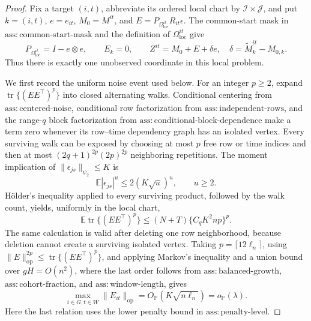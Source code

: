 \documentclass{article}
\begin{document}
\begin{proof}
Fix a target \((i,t)\), abbreviate its ordered local chart by \(\mathcal I\times\mathcal J\), and put \(k=(i,t)\), \(e=e_{it}\), \(M_0=M^{it}\), and \(E=P_{\Omega_{\mathrm{loc}}^{it}}R_{it}\epsilon\). The common-start mask in \(\mathrm{ass:common\mbox{-}start\mbox{-}mask}\) and the definition of \(\Omega_{\mathrm{loc}}^{it}\) give
\[
 P_{\Omega_{\mathrm{loc}}^{it}}=I-e\otimes e,
 \qquad E_k=0,
 \qquad Z^{it}=M_0+E+\delta e,
 \quad \delta=\widetilde M^{it}_k-M_{0,k}.
\tag{1}
\]
Thus there is exactly one unobserved coordinate in this local problem.

We first record the uniform noise event used below. For an integer \(p\ge2\), expand
\(\operatorname{tr}\{(EE^{\top})^p\}\) into closed alternating walks. Conditional centering from \(\mathrm{ass:centered\mbox{-}noise}\), conditional row factorization from \(\mathrm{ass:independent\mbox{-}rows}\), and the range-\(q\) block factorization from \(\mathrm{ass:conditional\mbox{-}block\mbox{-}dependence}\) make a term zero whenever its row--time dependency graph has an isolated vertex. Every surviving walk can be exposed by choosing at most \(p\) free row or time indices and then at most \((2q+1)^{2p}(2p)^{2p}\) neighboring repetitions. The moment implication of \(\|\epsilon_{js}\|_{\psi_2}\le K\) is
\[
 \mathbb E|\epsilon_{js}|^u\le 2(K\sqrt u)^u,
 \qquad u\ge2.
\tag{2}
\]
Hölder's inequality applied to every surviving product, followed by the walk count, yields, uniformly in the local chart,
\[
 \mathbb E\operatorname{tr}\{(EE^{\top})^p\}
 \le (N+T)\{C_qK^2np\}^{p}.
\tag{3}
\]
The same calculation is valid after deleting one row neighborhood, because deletion cannot create a surviving isolated vertex. Taking \(p=\lceil 12\ell_n\rceil\), using \(\|E\|_{\mathrm{op}}^{2p}\le\operatorname{tr}\{(EE^{\top})^p\}\), and applying Markov's inequality and a union bound over \(gH=O(n^2)\), where the last order follows from \(\mathrm{ass:balanced\mbox{-}growth}\), \(\mathrm{ass:cohort\mbox{-}fraction}\), and \(\mathrm{ass:window\mbox{-}length}\), gives
\[
 \max_{i\in G,t\in W}\|E_{it}\|_{\mathrm{op}}
 =O_{\mathbb P}(K\sqrt{n\ell_n})=o_{\mathbb P}(\lambda).
\tag{4}
\]
Here the last relation uses the lower penalty bound in \(\mathrm{ass:penalty\mbox{-}level}\).


\end{proof}
\end{document}
